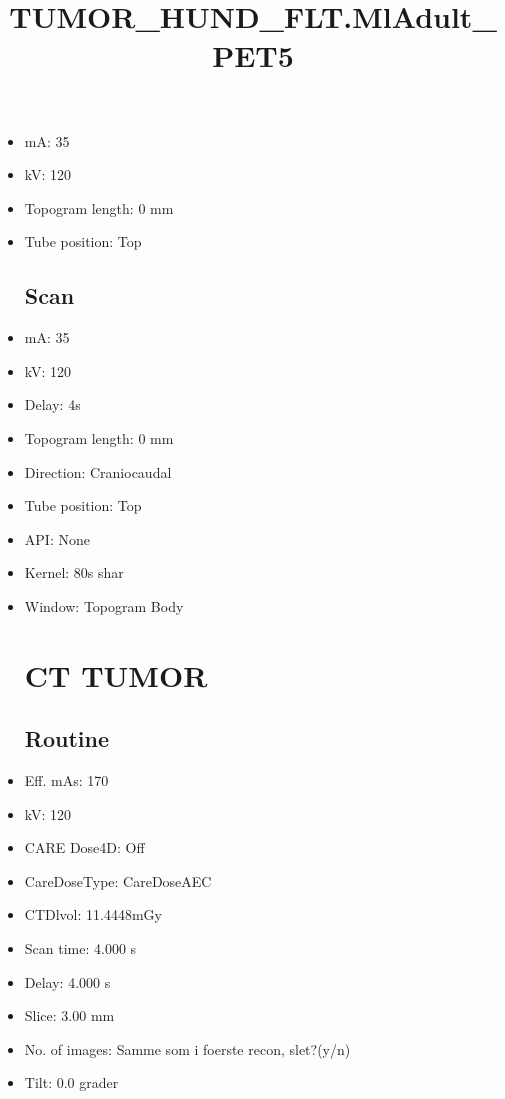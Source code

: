 \documentclass[12pt]{article}
\title{TUMOR\_HUND\_FLT.MlAdult\_PET5}
\begin{document}
\maketitle
\newpage
\tableofcontents
\newpage
{}


\begin{itemize}[noitemsep]\section{Topogram}
\subsection{Routine}
\item mA: 35\item kV: 120\item Topogram length: 0 mm\item Tube position: Top
\subsection{Scan}\item mA: 35\item kV: 120\item Delay: 4s\item Topogram length: 0 mm\item Direction: Craniocaudal\item Tube position: Top\item API: None\item Kernel: 80s shar\item Window: Topogram Body
\section{CT TUMOR}
\subsection{Routine}
\item Eff. mAs: 170\item kV: 120\item CARE Dose4D: Off\item CareDoseType: CareDoseAEC\item CTDlvol: 11.4448mGy\item Scan time: 4.000 s\item Delay: 4.000 s\item Slice: 3.00 mm\item No. of images: Samme som i foerste recon, slet?(y/n)\item Tilt: 0.0 grader

\end{itemize}
\end{document}
